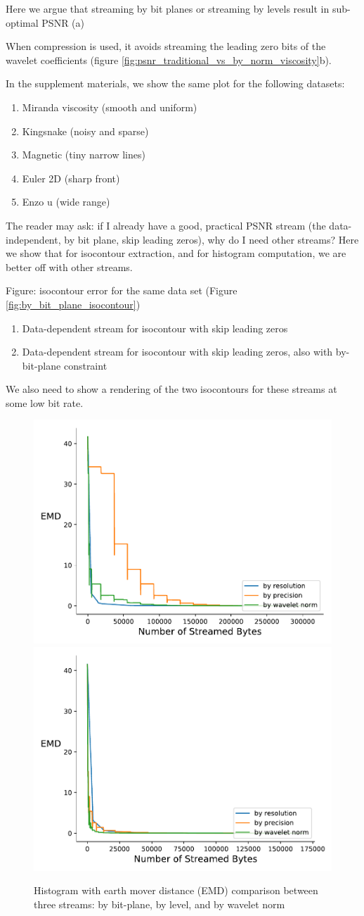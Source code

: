 Here we argue that streaming by bit planes or streaming by levels result in sub-optimal PSNR (a)


When compression is used, it avoids streaming the leading zero bits of the wavelet coefficients (figure \ref{fig:psnr_traditional_vs_by_norm_viscosity}b).

In the supplement materials, we show the same plot for the following datasets:
\begin{enumerate}
  \item Miranda viscosity (smooth and uniform)
  \item Kingsnake (noisy and sparse)
  \item Magnetic (tiny narrow lines)
  \item Euler 2D (sharp front)
  \item Enzo u (wide range)
\end{enumerate}

The reader may ask: if I already have a good, practical PSNR stream (the data-independent, by bit plane, skip leading zeros), why do I need other streams? Here we show that for isocontour extraction, and for histogram computation, we are better off with other streams.
  
Figure: isocontour error for the same data set (Figure \ref{fig:by_bit_plane_isocontour})
\begin{enumerate}
  \item Data-dependent stream for isocontour with skip leading zeros
  \item Data-dependent stream for isocontour with skip leading zeros, also with by-bit-plane constraint
\end{enumerate}

We also need to show a rendering of the two isocontours for these streams at some low bit rate.

\begin{figure}[htb!]
	\centering
	{\includegraphics[width=0.4\linewidth]{img/independent/histogram-miranda-viscosity}}
	{\includegraphics[width=0.4\linewidth]{img/skip-zeros/histogram-miranda-viscosity}}
	\caption {Histogram with earth mover distance (EMD) comparison between three streams: by bit-plane, by level, and by wavelet norm}
	\label{fig:histogram_traditional_vs_by_norm_viscosity}
\end{figure}


